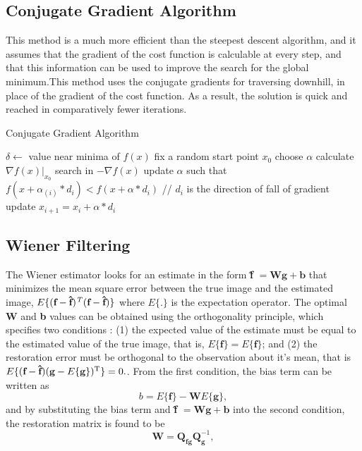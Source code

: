 \documentclass[a4paper]{book}
\begin{document}
\subsection{Conjugate Gradient Algorithm}
This method is a much more efficient than the steepest descent algorithm,
and it assumes that the gradient of the cost function is calculable at every step, and that this information can be used to improve the search for the global minimum.This method uses the conjugate gradients for traversing
downhill, in place of the gradient of the cost function. As a result, the solution is quick and reached in comparatively fewer iterations.\cite{Fletcher00opt}
\begin{algorithm}[h!]
	\caption{Conjugate Gradient Algorithm}
	\label{alg2}
	\begin{algorithmic}
		\STATE $ \delta \leftarrow$ value near minima of  $f(x) $ 
		\STATE fix a random start point  $ x_{0} $
		\STATE choose  $ \alpha $ 
		\STATE	calculate $ \nabla f(x) |_{x_{0}}$
		\STATE search in $ - \nabla f(x)$
		\STATE update $ \alpha $ such that $ f(x + \alpha_{(i)}*d_{i}) < f(x + \alpha*d_{i})$  // $ d_{i} $  is the direction of fall of gradient
		\STATE update $ x_{i+1} = x_{i} + \alpha*d_{i} $  
		\ENDIF
	\end{algorithmic}
	
\end{algorithm}


\subsection{Wiener Filtering}
The Wiener estimator looks for an estimate in the form \textbf{\^{f}} $ = \textbf{Wg} + \textbf{b} $ that minimizes the mean square error between the true image and the estimated image, $E\{(\textbf{f}-\textbf{\^{f}})\textsuperscript{\textit{T}}(\textbf{f}-\textbf{\^{f}})\}$ where $ E\{.\} $ is the expectation operator. The optimal \textbf{W} and \textbf{b} values can be obtained using the orthogonality principle\cite{Pap91opt}, which specifies two conditions : (1) the expected value of the estimate must be equal to the estimated value of the true image, that is, $ E\{\textbf{\^{f}}\} = E\{\textbf{f}\} $; and (2) the restoration error must be orthogonal to the observation about it's mean, that is $ E\{(\textbf{f}-\textbf{\^{f}})(\textbf{g}-E\{\textbf{g}\})\textsuperscript{T}\} = 0.$. From the first condition, the bias term can be written as 
\begin{equation}
\label{eq3.7}
b = E\{\textbf{f}\} - \textbf{W}E\{\textbf{g}\},
\end{equation}
and by substituting the bias term and \textbf{\^{f}} $ = \textbf{Wg} + \textbf{b} $ into the second condition, the restoration matrix is found to be 
\begin{equation}
\label{eq3.8}
\textbf{W} = \textbf{Q}_{\textbf{fg}}\textbf{Q}_{\textbf{g}}^{-1},
\end{equation}
\end{document}
